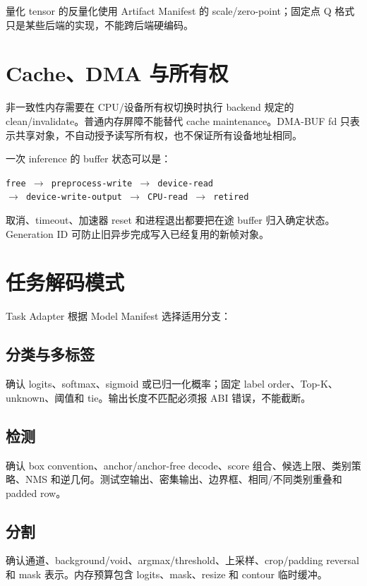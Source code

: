 量化 tensor 的反量化使用 Artifact Manifest 的 scale/zero-point；固定点 Q 格式只是某些后端的实现，不能跨后端硬编码。

\section{Cache、DMA 与所有权}

非一致性内存需要在 CPU/设备所有权切换时执行 backend 规定的 clean/invalidate。普通内存屏障不能替代 cache maintenance。DMA-BUF fd 只表示共享对象，不自动授予读写所有权，也不保证所有设备地址相同。

一次 inference 的 buffer 状态可以是：

\begin{center}
\texttt{free $\rightarrow$ preprocess-write $\rightarrow$ device-read}
\\
\texttt{$\rightarrow$ device-write-output $\rightarrow$ CPU-read $\rightarrow$ retired}
\end{center}

取消、timeout、加速器 reset 和进程退出都要把在途 buffer 归入确定状态。Generation ID 可防止旧异步完成写入已经复用的新帧对象。

\section{任务解码模式}

Task Adapter 根据 Model Manifest 选择适用分支：

\subsection{分类与多标签}

确认 logits、softmax、sigmoid 或已归一化概率；固定 label order、Top-K、unknown、阈值和 tie。输出长度不匹配必须报 ABI 错误，不能截断。

\subsection{检测}

确认 box convention、anchor/anchor-free decode、score 组合、候选上限、类别策略、NMS 和逆几何。测试空输出、密集输出、边界框、相同/不同类别重叠和 padded row。

\subsection{分割}

确认通道、background/void、argmax/threshold、上采样、crop/padding reversal 和 mask 表示。内存预算包含 logits、mask、resize 和 contour 临时缓冲。

